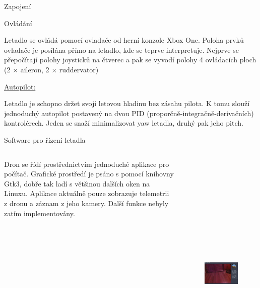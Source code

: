 \documentclass[final]{beamer}
\newlength{\colwidth}
\begin{document}
\begin{frame}[t]
\begin{columns}[t]
\begin{column}{\colwidth}
\begin{block}{Zapojení}
			\end{block}



			\begin{block}{Ovládání}

				Letadlo se ovládá pomocí ovladače od herní konzole Xbox One.
				Poloha prvků ovladače je posílána přímo na letadlo, kde se teprve interpretuje.
				Nejprve se přepočítají polohy joysticků na čtverec a pak se vyvodí polohy 4 ovládacích ploch (2 $\times$ aileron, 2 $\times$ ruddervator)

				\underline{Autopilot:}

				Letadlo je schopno držet svojí letovou hladinu bez zásahu pilota.
				K tomu slouží jednoduchý autopilot postavený na dvou PID (proporčně-integračně-derivačních) kontrolérech.
				Jeden se snaží minimalizovat yaw letadla, druhý pak jeho pitch.

			\end{block}

      \begin{block}{Software pro řízení letadla}

			\begin{columns}[T]
				\begin{column}{.4\textwidth}
					Dron se řídí prostřednictvím jednoduché aplikace pro počítač.
					Grafické prostředí je psáno s pomocí knihovny Gtk3, dobře tak ladí s většinou dalších oken na Linuxu.
					Aplikace aktuálně pouze zobrazuje telemetrii z dronu a záznam z jeho kamery.
					Další funkce nebyly zatím implementovány.

				\end{column}
				\begin{column}{.6\textwidth}
			\begin{figure}[h]
				\centering
				\includegraphics[height=12cm]{./interface.png}
			\end{figure}


\end{column}
\end{columns}
\end{block}
\end{column}
\end{columns}
\end{frame}
\end{document}
